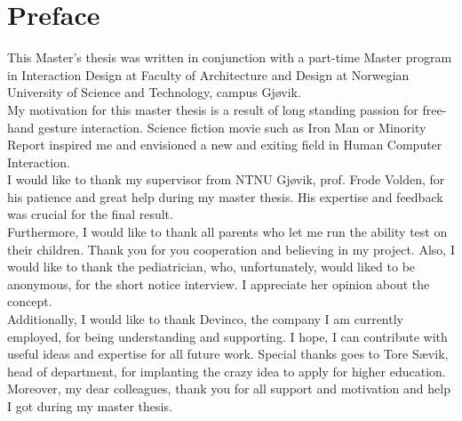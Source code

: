 \hypersetup{pageanchor=false}
%

\chapter*{Preface}



This Master's thesis was written in conjunction with a part-time Master program in Interaction Design at Faculty of Architecture and Design at Norwegian University of Science and Technology, campus Gjøvik.\\%

My motivation for this master thesis is a result of long standing passion for free-hand gesture interaction. Science fiction movie such as Iron Man or Minority Report inspired me and envisioned a new and exiting field in Human Computer Interaction.\\


I would like to thank my supervisor from NTNU Gjøvik, prof. Frode Volden, for his patience and great help during my master thesis. His expertise and feedback was crucial for the final result.\\

Furthermore, I would like to thank all parents who let me run the ability test on their children. Thank you for you cooperation and believing in my project. 
Also, I would like to thank the pediatrician, who, unfortunately, would liked to be anonymous,  for the short notice interview. I appreciate her opinion about the concept.\\

Additionally, I would like to thank Devinco, the company I am currently employed, for being understanding and supporting. I hope, I can contribute with useful ideas and expertise for all future work. Special thanks goes to Tore Sævik, head of department, for implanting the crazy idea to apply for higher education. Moreover, my dear colleagues, thank you for all support and motivation and help I got during my master thesis. \\

